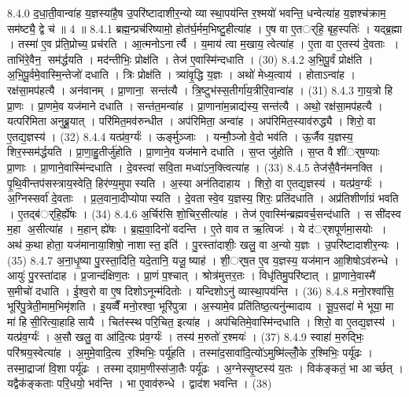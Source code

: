 8.4.0
द॒धा॒ती॒वान्वा॑ह य॒ज्ञस्या॑है॒ष उ॒परि॑ष्टादाशीर॒न्यो व्यास्था॒पय॑न्ति र॒श्मयो॑ भवन्ति॒ धन्वेत्या॑ह य॒ज्ञश्च॑क्राम॒ सम॑ष्ट्यै॒ द्वे च॑ ॥ 4 ॥
8.4.1
ब्रह्म॒न्प्रच॑रिष्यामो॒ होत॑र्घ॒र्मम॒भिष्टु॒हीत्या॑ह । ए॒ष वा ए॒तर््हि॒ बृह॒स्पतिः॑ । यद्ब्र॒ह्मा । तस्मा॑ ए॒व प्र॑ति॒प्रोच्य॒ प्रच॑रति । आ॒त्मनोऽनार्त्यै । य॒माय॑ त्वा म॒खाय॒ त्वेत्या॑ह । ए॒ता वा ए॒तस्य॑ दे॒वताः । ताभि॑रे॒वैन॒ सम॑र्द्धयति । मद॑न्तीभिः॒ प्रोक्ष॑ति । तेज॑ ए॒वास्मि॑न्दधाति । (30)
8.4.2
अ॒भि॒पू॒र्वं प्रोक्ष॑ति । अ॒भि॒पू॒र्वमे॒वास्मि॒न्तेजो॑ दधाति । त्रिः प्रोक्ष॑ति । त्र्या॑वृ॒द्धि य॒ज्ञः । अथो॑ मेध्य॒त्वाय॑ । होताऽन्वा॑ह । रक्ष॑सा॒मप॑हत्यै । अन॑वानम् । प्रा॒णाना॒ सन्त॑त्यै । त्रि॒ष्टुभ॑स्स॒तीर्गा॑य॒त्रीरि॒वान्वा॑ह । (31)
8.4.3
गा॒य॒त्रो हि प्रा॒णः । प्रा॒णमे॒व यज॑माने दधाति । सन्त॑त॒मन्वा॑ह । प्रा॒णाना॑म॒न्नाद्य॑स्य॒ सन्त॑त्यै । अथो॒ रक्ष॑सा॒मप॑हत्यै । यत्परि॑मिता अनुब्रू॒यात् । परि॑मित॒मव॑रुन्धीत । अप॑रिमिता॒ अन्वा॑ह । अप॑रिमित॒स्याव॑रुद्ध्यै । शिरो॒ वा ए॒तद्य॒ज्ञस्य॑ । (32)
8.4.4
यत्प्र॑व॒र्ग्यः॑ । ऊर्ङ्मुञ्जाः । यन्मौ॒ञ्जो वे॒दो भव॑ति । ऊ॒र्जैव य॒ज्ञस्य॒ शिर॒स्सम॑र्द्धयति । प्रा॒णा॒हु॒तीर्जु॑होति । प्रा॒णाने॒व यज॑माने दधाति । स॒प्त जु॑होति । स॒प्त वै शी॑र््ष॒ण्याः प्रा॒णाः । प्रा॒णाने॒वास्मि॑न्दधाति । दे॒वस्त्वा॑ सवि॒ता मध्वा॑ऽन॒क्त्वित्या॑ह । (33)
8.4.5
तेज॑सै॒वैन॑मनक्ति । पृ॒थि॒वीन्तप॑सस्त्राय॒स्वेति॒ हिर॑ण्य॒मुपास्यति । अ॒स्या अन॑तिदाहाय । शिरो॒ वा ए॒तद्य॒ज्ञस्य॑ । यत्प्र॑व॒र्ग्यः॑ । अ॒ग्निस्सर्वा॑ दे॒वताः । प्र॒ल॒वाना॒दीप्योपास्यति । दे॒वतास्वे॒व य॒ज्ञस्य॒ शिरः॒ प्रति॑दधाति । अप्र॑तिशीर्णाग्रं भवति । ए॒तद्ब॑र््हि॒र्\mbox{}ह्ये॑षः । (34)
8.4.6
अ॒र्चिर॑सि शो॒चिर॒सीत्या॑ह । तेज॑ ए॒वास्मि॑न्ब्रह्मवर्च॒सन्द॑धाति । ससी॑दस्व म॒हा अ॒सीत्या॑ह । म॒हान् ह्ये॑षः । ब्र॒ह्म॒वा॒दिनो॑ वदन्ति । ए॒ते वाव त ऋ॒त्विजः॑ । ये द॑र््शपूर्णमा॒सयोः । अथ॑ क॒था होता॒ यज॑मानाया॒शिषो॒ नाशास्त॒ इति॑ । पु॒रस्ता॑दाशीः॒ खलु॒ वा अ॒न्यो य॒ज्ञः । उ॒परि॑ष्टादाशीर॒न्यः । (35)
8.4.7
अ॒ना॒धृ॒ष्या पु॒रस्ता॒दिति॒ यदे॒तानि॒ यजू॒ष्याह॑ । शी॒र््ष॒त ए॒व य॒ज्ञस्य॒ यज॑मान आ॒शिषोऽव॑रुन्धे । आयुः॑ पु॒रस्ता॑दाह । प्र॒जान्द॑क्षिण॒तः । प्रा॒णं प॒श्चात् । श्रोत्र॑मुत्तर॒तः । विधृ॑तिमु॒परि॑ष्टात् । प्रा॒णाने॒वास्मै॑ स॒मीचो॑ दधाति । ई॒श्व॒रो वा ए॒ष दिशोऽनून्म॑दितोः । यन्दिशोऽनु॑ व्यास्था॒पय॑न्ति । (36)
8.4.8
मनो॒रश्वा॑सि॒ भूरि॑पु॒त्रेती॒माम॒भिमृ॑शति । इ॒यव्वैँ मनो॒रश्वा॒ भूरि॑पुत्रा । अ॒स्यामे॒व प्रति॑तिष्ठ॒त्यनु॑न्मादाय । सू॒प॒सदा॑ मे भूया॒ मा मा॑ हिसी॒रित्या॒हाहिसायै । चित॑स्स्थ परि॒चित॒ इत्या॑ह । अप॑चितिमे॒वास्मि॑न्दधाति । शिरो॒ वा ए॒तद्य॒ज्ञस्य॑ । यत्प्र॑व॒र्ग्यः॑ । अ॒सौ खलु॒ वा आ॑दि॒त्यः प्र॑व॒र्ग्यः॑ । तस्य॑ म॒रुतो॑ र॒श्मयः॑ । (37)
8.4.9
स्वाहा॑ म॒रुद्भिः॒ परि॑श्रय॒स्वेत्या॑ह । अ॒मुमे॒वादि॒त्य र॒श्मिभिः॒ पर्यू॑हति । तस्मा॑द॒सावा॑दि॒त्यो॑ऽमुष्मि॑ल्लोँ॒के र॒श्मिभिः॒ पर्यू॑ढः । तस्मा॒द्राजा॑ वि॒शा पर्यू॑ढः । तस्माद्ग्राम॒णीस्स॑जा॒तैः पर्यू॑ढः । अ॒ग्नेस्सृ॒ष्टस्य॑ य॒तः । विक॑ङ्कतं॒ भा आर्च्छत् । यद्वैक॑ङ्कताः परि॒धयो॒ भव॑न्ति । भा ए॒वाव॑रुन्धे । द्वाद॑श भवन्ति । (38)
